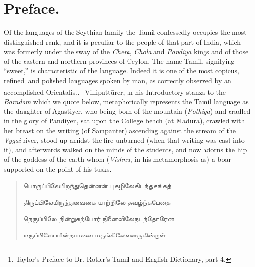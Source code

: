 \documentclass{article}
\newcommand{\TamilText}[1]{\texttamil{#1}}
\newcommand{\tam}[1]{\TamilText{#1}}
\begin{document}
\section*{Preface.}
\paragraph{}
Of the languages of the Scythian family the Tamil confessedly occupies the most distinguished rank, and it is peculiar to the people of that part of India, which was formerly under the sway of the \emph{Chera}, \emph{Chola} and \emph{Pandiya} kings and of those of the eastern and northern provinces of Ceylon. The name Tamil, signifying ``sweet,'' is characteristic of the language. Indeed it is one of the most copious, refined, and polished languages spoken by man, as correctly observed by an accomplished Orientalist.\footnote{Taylor's Preface to Dr. Rotler's Tamil and English Dictionary, part 4.} Villiputt\={u}rer, in his Introductory stanza to the \emph{Baradam} which we quote below, metaphorically represents the Tamil language as the daughter of Agastiyer, who being born of the mountain (\emph{Pothiya}) and cradled in the glory of Pandiyen, sat upon the College bench (at Madura), crawled with her breast on the writing (of Sampanter) ascending against the stream of the \emph{Vygai} river, stood up amidst the fire unburned (when that writing was cast into it), and afterwards walked on the minds of the students, and now adorns the hip of the goddess of the earth whom (\emph{Vishnu}, in his metamorphosis as) a boar supported on the point of his tusks.
\begin{quotation}\small
\tam{பொருப்பிலேபிறந்துதென்னன்‌ புகழிலேகிடந்துசங்கத்‌}

\tam{திருப்‌பிலேயிருந்துவைகை யாற்றிலே தவழ்ந்தபேதை}

\tam{நெருப்பிலே நின்றுகற்போர்‌ நினைவிலேநடந்தோரேன}

\tam{மருப்பிலேபயின்றபாவை மருங்கிலேவளருகின்றாள்‌}.
\end{quotation}
\end{document}

